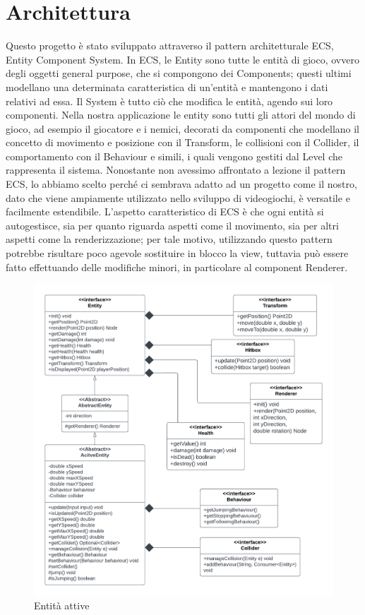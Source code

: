 \documentclass[a4paper,12pt]{report}
\begin{document}
\section{Architettura}
Questo progetto è stato sviluppato attraverso il pattern architetturale ECS, Entity Component System.
In ECS, le Entity sono tutte le entità di gioco, ovvero degli oggetti general purpose, che si compongono dei Components; questi ultimi modellano una determinata caratteristica di un'entità e mantengono i dati relativi ad essa. Il System è tutto ciò che modifica le entità, agendo sui loro componenti. Nella nostra applicazione le entity sono tutti gli attori del mondo di gioco, ad esempio il giocatore e i nemici, decorati da componenti che modellano il concetto di movimento e posizione con il Transform, le collisioni con il Collider, il comportamento con il Behaviour e simili, i quali vengono gestiti dal Level che rappresenta il sistema.
Nonostante non avessimo affrontato a lezione il pattern ECS, lo abbiamo scelto perché ci sembrava adatto ad un progetto come il nostro, dato che viene ampiamente utilizzato nello sviluppo di videogiochi, è versatile e facilmente estendibile.
L'aspetto caratteristico di ECS è che ogni entità si autogestisce, sia per quanto riguarda aspetti come il movimento, sia per altri aspetti come la renderizzazione; per tale motivo, utilizzando questo pattern potrebbe risultare poco agevole sostituire in blocco la view, tuttavia può essere fatto effettuando delle modifiche minori, in particolare al component Renderer.

\begin{figure}[ht]
\includegraphics[width=1\textwidth]{umlEntityComponents.png}
\caption{Entità attive}
\label{fig:schgen}
\end{figure}
\end{document}
